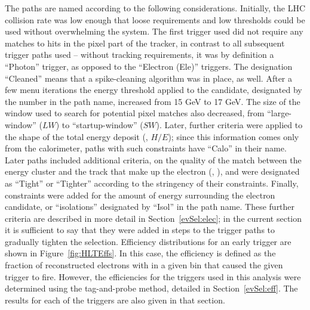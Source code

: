 The paths are named according to the following considerations.  
Initially, the LHC collision rate was low enough that loose 
requirements and low thresholds could be used without 
overwhelming the system.  
The first trigger used did not require any matches to 
hits in the pixel part of the tracker, 
in contrast to all subsequent trigger paths used -- 
without tracking requirements, it was by definition a 
``Photon'' trigger, 
as opposed to the ``Electron (Ele)'' triggers.  
The designation ``Cleaned'' means that a spike-cleaning 
algorithm was in place, as well.  
After a few menu iterations 
the energy threshold applied to the candidate, 
designated by the number in the path name,  
increased from 15 GeV to 17 GeV.  
The size of the window used to search for potential pixel 
matches also decreased, from ``large-window'' ($LW$) 
to ``startup-window'' ($SW$). %
Later, further criteria were applied to 
the shape of the total energy deposit (\sieie, $H/E$); %
since this information comes only from the calorimeter, 
paths with such constraints have ``Calo'' in their name.  
Later paths included additional criteria, 
on the quality of the match between the energy cluster and the track 
that make up the electron (\detain, \dphiin), 
and were designated as ``Tight'' or ``Tighter'' according 
to the stringency of their constraints.  
Finally, constraints were added for the amount of energy surrounding 
the electron candidate, or ``isolations'' 
designated by ``Isol'' in the path name.  
These further criteria are described in more detail in 
Section~\ref{evSel:elec}; 
in the current section it is sufficient to say that they 
were added in steps to the trigger paths to gradually tighten the 
selection.  
Efficiency distributions for an early trigger are shown 
in Figure~\ref{fig:HLTEffs}.  
In this case, the efficiency is defined as the fraction of reconstructed electrons
with \Et in a given bin that caused the given trigger to fire.
However, the efficiencies for the triggers used in this analysis 
were determined using the tag-and-probe method, detailed in 
Section~\ref{evSel:eff}.  
The results for each of the triggers are also 
given in that section.  

